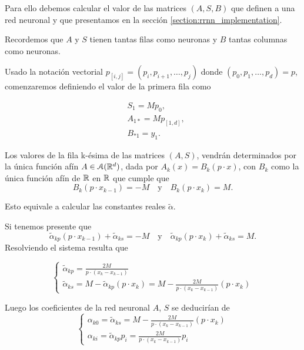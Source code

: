 \begin{aportacionOriginal}
Para ello debemos calcular el valor de las matrices $(A,S,B)$ que definen a una red neuronal y que presentamos en la sección \ref{section:rrnn_implementation}.

Recordemos que $A$ y $S$ tienen tantas filas como neuronas  y $B$ tantas columnas como neuronas. 

Usado la notación vectorial
$p_{[i,j]} = (p_i, p_{i+1}, \ldots, p_{j})$ donde $(p_0, p_1, \ldots, p_d)=p$, comenzaremos definiendo el valor de la primera fila como

\begin{align}
    &S_1 = M p_0, \\
    & A_{1 *} = M p_{[1,d]}, \\
    & B_{* 1} = y_1.
\end{align}

Los valores de la fila  k-ésima de las matrices $(A,S)$, vendrán determinados por la única función afín $A \in \mathcal{A}(\mathbb{R}^d)$, 
dada por $A_k(x)=B_k(p \cdot x)$, con $B_{k}$ como la única función afín de $\mathbb{R}$ en $\mathbb{R}$ que cumple que 
\begin{equation}
    B_k(p \cdot x_{k-1}) = -M 
    \quad \text{y} \quad 
     B_{k}(p \cdot x_k)= M.
\end{equation}

Esto equivale a calcular las constantes reales $\tilde {\alpha}$. 

Si tenemos presente que 
\begin{equation}
    \tilde{\alpha}_{k p} (p \cdot x_{k-1}) + \tilde{\alpha}_{k s} = -M 
    \quad \text{y} \quad 
    \tilde{\alpha}_{k p}(p \cdot x_k) + \tilde{\alpha}_{k s}= M.
\end{equation} 
Resolviendo el sistema resulta que 

\begin{equation}
    \left\{ 
        \begin{array}{l}
            \tilde{\alpha}_{k p} = \frac{2 M}{p \cdot (x_k - x_{k-1})}
            \\
            \tilde{\alpha}_{k s} 
            = M -  \tilde{\alpha}_{k p}(p \cdot x_{k})
            = M -  \frac{2 M}{p \cdot (x_k - x_{k-1})}(p \cdot x_{k}) 
        \end{array}
    \right.
\end{equation}

Luego los coeficientes de la red neuronal $A$, $S$ se deducirían de 
\begin{equation}
    \left\{ 
        \begin{array}{l}
            \alpha_{k 0} = \tilde{\alpha}_{k s} =
            M -  \frac{2 M}{p \cdot (x_k - x_{k-1})}(p \cdot x_{k}) 
            \\
            \alpha_{k i} =  \tilde{\alpha}_{k p} p_{i}
            = 
            \frac{2 M}{p \cdot (x_k - x_{k-1})}
            p_i 
        \end{array}
        \right.
\end{equation}


\end{aportacionOriginal}
